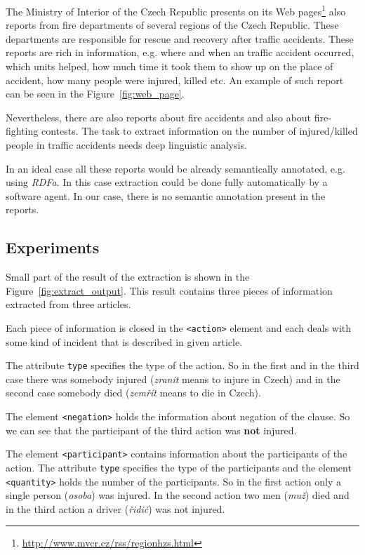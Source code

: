 The Ministry of Interior of the Czech Republic presents on its Web pages\footnote{\url{http://www.mvcr.cz/rss/regionhzs.html}} also reports from fire departments of several regions of the Czech Republic. These departments are responsible for rescue and recovery after traffic accidents. These reports are rich in information, e.g. where and when an traffic accident occurred, which units helped, how much time it took them to show up on the place of accident, how many people were injured, killed etc. An example of such report can be seen in the Figure~\ref{fig:web_page}.


Nevertheless, there are also reports about fire accidents and also about fire-fighting contests. The task to extract information on the number of injured/killed people in traffic accidents needs deep linguistic analysis.


In an ideal case all these reports would be already semantically annotated, e.g. using \emph{RDFa}. In this case extraction could be done fully automatically by a software agent. In our case, there is no semantic annotation present in the reports.


\subsection{Experiments}

Small part of the result of the extraction is shown in the Figure~\ref{fig:extract_output}. This result contains three pieces of information extracted from three articles.

Each piece of information is closed in the \verb+<action>+ element and each deals with some kind of incident that is described in given article.

The attribute \verb+type+ specifies the type of the action. So in the first and in the third case there was somebody injured (\emph{zranit} means to injure in Czech) and in the second case somebody died (\emph{zemřít} means to die in Czech).

The element \verb+<negation>+ holds the information about negation of the clause. So we can see that the participant of the third action was \textbf{not} injured.

The element \verb+<participant>+ contains information about the participants of the action. The attribute \verb+type+ specifies the type of the participants and the element \verb+<quantity>+ holds the number of the participants. So in the first action only a single person (\emph{osoba}) was injured. In the second action two men (\emph{muž}) died and in the third action a driver (\emph{řidič}) was not injured.




